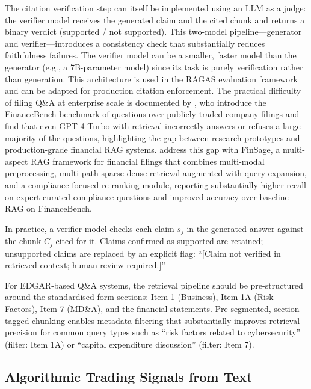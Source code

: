 \begin{context}
The citation verification step can itself be implemented using an LLM as a judge:
the verifier model receives the generated claim and the cited chunk and returns a
binary verdict (supported / not supported). This two-model pipeline---generator and
verifier---introduces a consistency check that substantially reduces faithfulness
failures. The verifier model can be a smaller, faster model than the generator (e.g.,
a 7B-parameter model) since its task is purely verification rather than generation.
This architecture is used in the RAGAS evaluation framework \cite{es2023ragas} and
can be adapted for production citation enforcement. The practical difficulty of filing
Q\&A at enterprise scale is documented by \citet{zhang2024financebench}, who introduce
the FinanceBench benchmark of questions over publicly traded company filings
and find that even GPT-4-Turbo with retrieval incorrectly answers or refuses a large
majority of the questions, highlighting the gap between research prototypes and
production-grade financial RAG systems. \citet{wang2025finsage} address this gap with
FinSage, a multi-aspect RAG framework for financial filings that combines multi-modal
preprocessing, multi-path sparse-dense retrieval augmented with query expansion, and a
compliance-focused re-ranking module, reporting substantially higher recall on
expert-curated compliance questions and improved accuracy over baseline RAG on FinanceBench.

In practice, a verifier model checks each claim $s_j$ in the generated answer against the
chunk $C_j$ cited for it. Claims confirmed as supported are retained; unsupported claims
are replaced by an explicit flag: ``[Claim not verified in retrieved context; human review required.]''

For EDGAR-based Q\&A systems, the retrieval pipeline should be pre-structured around
the standardised form sections: Item 1 (Business), Item 1A (Risk Factors), Item 7
(MD\&A), and the financial statements. Pre-segmented, section-tagged chunking enables
metadata filtering that substantially improves retrieval precision for common query
types such as ``risk factors related to cybersecurity'' (filter: Item 1A) or ``capital
expenditure discussion'' (filter: Item 7).


\subsection{Algorithmic Trading Signals from Text}
\label{subsec:trading-signals}


\end{context}
